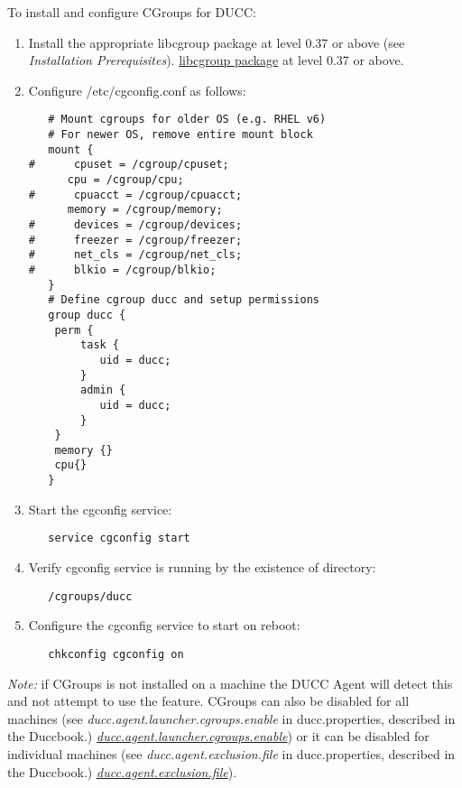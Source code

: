     To install and configure CGroups for DUCC:
    \begin{enumerate}
       \item Install the appropriate 
   \ifdefined\DUCCSTANDALONE
   libcgroup package at level 0.37 or above (see {\em Installation Prerequisites}).
   \else
   \hyperref[sec:install.prerequisites]{libcgroup package} at level 0.37 or above.
   \fi

       \item Configure /etc/cgconfig.conf as follows:
\begin{verbatim}
   # Mount cgroups for older OS (e.g. RHEL v6)
   # For newer OS, remove entire mount block 
   mount {
#      cpuset = /cgroup/cpuset;
      cpu = /cgroup/cpu;
#      cpuacct = /cgroup/cpuacct;
      memory = /cgroup/memory;
#      devices = /cgroup/devices;
#      freezer = /cgroup/freezer;
#      net_cls = /cgroup/net_cls;
#      blkio = /cgroup/blkio;
   }
   # Define cgroup ducc and setup permissions
   group ducc {
    perm {
        task {
           uid = ducc;
        }
        admin {
           uid = ducc;
        }
    }
    memory {}
    cpu{}
   }
\end{verbatim}
       \item Start the cgconfig service:
\begin{verbatim}
   service cgconfig start
\end{verbatim}
         
       \item Verify cgconfig service is running by the existence of directory: 
\begin{verbatim}
   /cgroups/ducc
\end{verbatim}

       \item Configure the cgconfig service to start on reboot:
\begin{verbatim}
   chkconfig cgconfig on
\end{verbatim}
    \end{enumerate}

{\em Note:} if CGroups is not installed on a machine the DUCC Agent will detect this and not 
  	attempt to use the feature. CGroups can also be disabled for all machines
   	(see 
   \ifdefined\DUCCSTANDALONE
   {\em ducc.agent.launcher.cgroups.enable} in ducc.properties, described in the Duccbook.)
   \else
   \hyperref[itm:props-agent.cgroups.enable] {\em ducc.agent.launcher.cgroups.enable}) 
   \fi
   	or it can be disabled for individual machines (see 
   \ifdefined\DUCCSTANDALONE
   {\em ducc.agent.exclusion.file} in ducc.properties, described in the Duccbook.)
   \else
   \hyperref[itm:props-agent.cgroups.exclusion]{\em ducc.agent.exclusion.file}).
   \fi


